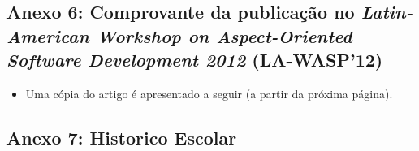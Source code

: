 
\subsection*{Anexo 6: Comprovante da publicação no \emph{Latin-American Workshop on Aspect-Oriented Software Development 2012} (LA-WASP'12)} \label{anexo:comprovante_SBES}


\begin{figure}[!h]
 \centering
 \label{fig:comprovante_vmil}
\end{figure}

\begin{itemize}
	\item Uma cópia do artigo é apresentado a seguir (a partir da próxima página).
\end{itemize}
\clearpage



\subsection*{Anexo 7: Historico Escolar} \label{anexo:historico_escolar}


